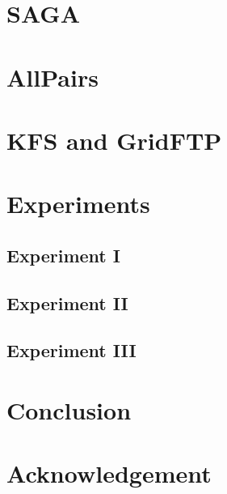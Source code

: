 \documentclass[a4paper,11pt]{article}
\begin{document}
\section{SAGA}
\section{AllPairs}
\section{KFS and GridFTP}
\section{Experiments}
\subsection{Experiment I}
\subsection{Experiment II}
\subsection{Experiment III}
\section{Conclusion}
\section{Acknowledgement}

 

\end{document}
